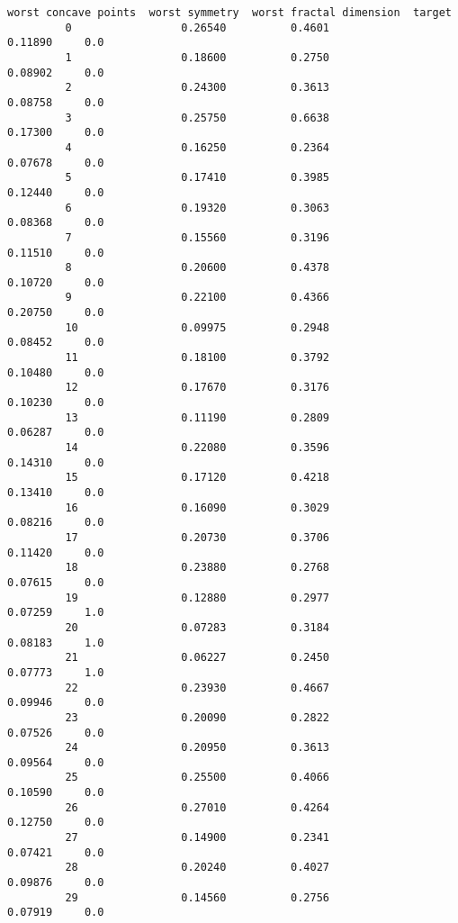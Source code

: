 \documentclass[11pt]{article}
\begin{document}
\begin{Verbatim}[commandchars=\\\{\}]
              worst concave points  worst symmetry  worst fractal dimension  target  
         0                 0.26540          0.4601                  0.11890     0.0  
         1                 0.18600          0.2750                  0.08902     0.0  
         2                 0.24300          0.3613                  0.08758     0.0  
         3                 0.25750          0.6638                  0.17300     0.0  
         4                 0.16250          0.2364                  0.07678     0.0  
         5                 0.17410          0.3985                  0.12440     0.0  
         6                 0.19320          0.3063                  0.08368     0.0  
         7                 0.15560          0.3196                  0.11510     0.0  
         8                 0.20600          0.4378                  0.10720     0.0  
         9                 0.22100          0.4366                  0.20750     0.0  
         10                0.09975          0.2948                  0.08452     0.0  
         11                0.18100          0.3792                  0.10480     0.0  
         12                0.17670          0.3176                  0.10230     0.0  
         13                0.11190          0.2809                  0.06287     0.0  
         14                0.22080          0.3596                  0.14310     0.0  
         15                0.17120          0.4218                  0.13410     0.0  
         16                0.16090          0.3029                  0.08216     0.0  
         17                0.20730          0.3706                  0.11420     0.0  
         18                0.23880          0.2768                  0.07615     0.0  
         19                0.12880          0.2977                  0.07259     1.0  
         20                0.07283          0.3184                  0.08183     1.0  
         21                0.06227          0.2450                  0.07773     1.0  
         22                0.23930          0.4667                  0.09946     0.0  
         23                0.20090          0.2822                  0.07526     0.0  
         24                0.20950          0.3613                  0.09564     0.0  
         25                0.25500          0.4066                  0.10590     0.0  
         26                0.27010          0.4264                  0.12750     0.0  
         27                0.14900          0.2341                  0.07421     0.0  
         28                0.20240          0.4027                  0.09876     0.0  
         29                0.14560          0.2756                  0.07919     0.0  

\end{Verbatim}
\end{document}
